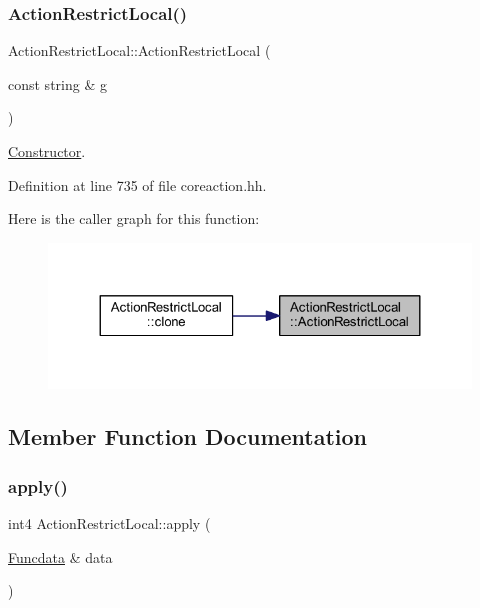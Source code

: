 \subsubsection{\texorpdfstring{ActionRestrictLocal()}{ActionRestrictLocal()}}
{\footnotesize\ttfamily Action\+Restrict\+Local\+::\+Action\+Restrict\+Local (\begin{DoxyParamCaption}\item[{const string \&}]{g }\end{DoxyParamCaption})\hspace{0.3cm}{\ttfamily [inline]}}



\mbox{\hyperlink{class_constructor}{Constructor}}. 



Definition at line 735 of file coreaction.\+hh.

Here is the caller graph for this function\+:
\nopagebreak
\begin{figure}[H]
\begin{center}
\leavevmode
\includegraphics[width=324pt]{class_action_restrict_local_a787620aa597a3b7d8baffd07bbdfae21_icgraph}
\end{center}
\end{figure}


\subsection{Member Function Documentation}
\mbox{\label{class_action_restrict_local_acd58fcc24c2a2c8f7dc0d07e3d2c9cfc}} 
\subsubsection{\texorpdfstring{apply()}{apply()}}
{\footnotesize\ttfamily int4 Action\+Restrict\+Local\+::apply (\begin{DoxyParamCaption}\item[{\mbox{\hyperlink{class_funcdata}{Funcdata}} \&}]{data }\end{DoxyParamCaption})\hspace{0.3cm}{\ttfamily [virtual]}}



